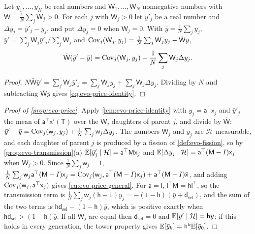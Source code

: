 \begin{lemma}\label{lem:evo-price-identity}
Let $y_1,\dots,y_N$ be real numbers and $\mathsf W_1,\dots,\mathsf W_N$ nonnegative numbers with $\bar{\mathsf W}=\frac1N\sum_j\mathsf W_j>0$. For each $j$ with $\mathsf W_j>0$ let $\bar y'_j$ be a real number and $\Delta y_j=\bar y'_j-y_j$, and put $\Delta y_j=0$ when $\mathsf W_j=0$. With $\bar y=\frac1N\sum_jy_j$, $\bar y'=\sum_j\mathsf W_j\bar y'_j/\sum_j\mathsf W_j$ and $\operatorname{Cov}_j(\mathsf W_j,y_j)=\frac1N\sum_j\mathsf W_jy_j-\bar{\mathsf W}\bar y$,
\begin{equation}\label{eq:evo-price-identity}
\bar{\mathsf W}(\bar y'-\bar y)=\operatorname{Cov}_j(\mathsf W_j,y_j)+\frac1N\sum_j\mathsf W_j\Delta y_j.
\end{equation}
\end{lemma}

\begin{proof}
$N\bar{\mathsf W}\bar y'=\sum_j\mathsf W_j\bar y'_j=\sum_j\mathsf W_jy_j+\sum_j\mathsf W_j\Delta y_j$. Dividing by $N$ and subtracting $\bar{\mathsf W}\bar y$ gives \eqref{eq:evo-price-identity}.
\end{proof}

\begin{proof}[Proof of \cref{prop:evo-price}]
Apply \cref{lem:evo-price-identity} with $y_j=\mathsf a^\top\mathsf x_j$ and $\bar y'_j$ the mean of $\mathsf a^\top\mathsf x'(\mathsf T)$ over the $\mathsf W_j$ daughters of parent $j$, and divide by $\bar{\mathsf W}$: $\bar y'-\bar y=\operatorname{Cov}_j(\mathsf w_j,y_j)+\frac1N\sum_j\mathsf w_j\Delta y_j$. The numbers $\mathsf W_j$ and $y_j$ are $\mathcal H$-measurable, and each daughter of parent $j$ is produced by a fission of \cref{def:evo-fission}, so by \cref{prop:evo-transmission}(a) $\mathbb{E}[\bar y'_j\mid\mathcal H]=\mathsf a^\top\mathsf M\mathsf x_j$ and $\mathbb{E}[\Delta y_j\mid\mathcal H]=\mathsf a^\top(\mathsf M-I)\mathsf x_j$ when $\mathsf W_j>0$. Since $\frac1N\sum_j\mathsf w_j=1$, $\frac1N\sum_j\mathsf w_j\mathsf a^\top(\mathsf M-I)\mathsf x_j=\operatorname{Cov}_j(\mathsf w_j,\mathsf a^\top(\mathsf M-I)\mathsf x_j)+\mathsf a^\top(\mathsf M-I)\bar{\mathsf x}$, and adding $\operatorname{Cov}_j(\mathsf w_j,\mathsf a^\top\mathsf x_j)$ gives \eqref{eq:evo-price-general}. For $\mathsf a=\mathsf l$, $\mathsf l^\top\mathsf M=\mathsf h\mathsf l^\top$, so the transmission term is $\frac1N\sum_j\mathsf w_j(\mathsf h-1)y_j=-(1-\mathsf h)(\bar y+\mathsf d_{\mathrm{sel}})$, and the sum of the two terms is $\mathsf h\mathsf d_{\mathrm{sel}}-(1-\mathsf h)\bar y$, which is positive exactly when $\mathsf h\mathsf d_{\mathrm{sel}}>(1-\mathsf h)\bar y$. If all $\mathsf W_j$ are equal then $\mathsf d_{\mathrm{sel}}=0$ and $\mathbb{E}[\bar y'\mid\mathcal H]=\mathsf h\bar y$; if this holds in every generation, the tower property gives $\mathbb{E}[\bar y_k]=\mathsf h^k\mathbb{E}[\bar y_0]$.
\end{proof}

